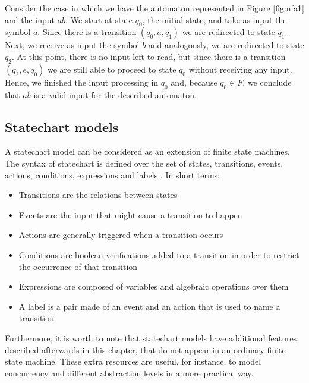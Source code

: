 Consider the case in which we have the automaton represented in Figure \ref{fig:nfa1} and the input $ab$. We start at state $q_0$, the initial state, and take as input the symbol $a$. Since there is a transition $(q_0,a,q_1)$ we are redirected to state $q_1$. Next, we receive as input the symbol $b$ and analogously, we are redirected to state $q_2$. At this point, there is no input left to read, but since there is a transition $(q_2,e,q_0)$ we are still able to proceed to state $q_0$ without receiving any input. Hence, we finished the input processing in $q_0$ and, because $q_0 \in F$, we conclude that $ab$ is a valid input for the described automaton.

\subsection{Statechart models}

A statechart model can be considered as an extension of finite state machines. The syntax of statechart is defined over the set of states, transitions, events, actions, conditions, expressions and labels \cite{harel87:semantics_statecharts}. In short terms:

\begin{itemize}

\item Transitions are the relations between states

\item Events are the input that might cause a transition to happen

\item Actions are generally triggered when a transition occurs

\item Conditions are boolean verifications added to a transition in order to restrict the occurrence of that transition

\item Expressions are composed of variables and algebraic operations over them

\item A label is a pair made of an event and an action that is used to name a transition
\end{itemize}

Furthermore, it is worth to note that statechart models have additional features, described afterwards in this chapter, that do not appear in an ordinary finite state machine. These extra resources are useful, for instance, to model concurrency and different abstraction levels in a more practical way.

